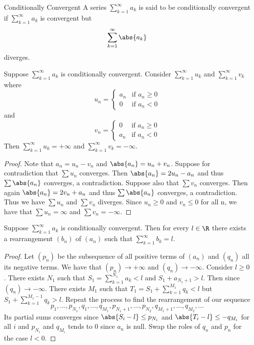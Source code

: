 \begin{defn}{Conditionally Convergent}{} A series $\sum_{k=1}^{\infty}a_k$ is said to be conditionally convergent if $\sum_{k=1}^{\infty}a_k$ is convergent but $$\sum_{k=1}^{\infty}\abs{a_k}$$ diverges. 
\end{defn}

\begin{thm}{}{} Suppose $\sum_{k=1}^{\infty}a_k$ is conditionally convergent. Consider $\sum_{k=1}^{\infty}u_k$ and $\sum_{k=1}^{\infty}v_k$ where $$u_n=\begin{cases}
a_n & \text{if $a_n\geq0$} \\
0 & \text{if $a_n<0$}
\end{cases}$$
and
$$v_n=\begin{cases}
0 & \text{if $a_n\geq0$} \\
a_n & \text{if $a_n<0$}
\end{cases}$$
Then $\sum_{k=1}^{\infty}u_k=+\infty$ and $\sum_{k=1}^{\infty}v_k=-\infty$. \tcbline
\begin{proof}
Note that $a_n=u_n-v_n$ and $\abs{a_n}=u_n+v_n$. Suppose for contradiction that $\sum u_n$ converges. Then $\abs{a_n}=2u_n-a_n$ and thus $\sum\abs{a_n}$ converges, a contradiction. Suppose also that $\sum v_n$ converges. Then again $\abs{a_n}=2v_n+a_n$ and thus $\sum\abs{a_n}$ converges, a contradiction. Thus we have $\sum u_n$ and $\sum v_n$ diverges. Since $u_n\geq 0$ and $v_n\leq 0$ for all n, we have that $\sum u_n=\infty$ and $\sum v_n=-\infty$. 
\end{proof}
\end{thm}

\begin{thm}{}{} Suppose $\sum_{k=1}^{\infty}a_k$ is conditionally convergent. Then for every $l\in\R$ there exists a rearrangement $(b_n)$ of $(a_n)$ such that $\sum_{k=1}^{\infty}b_k=l$. \tcbline
\begin{proof}
Let $(p_n)$ be the subsequence of all positive terms of $(a_n)$ and $(q_n)$ all its negative terms. We have that $(p_n)\to+\infty$ and $(q_n)\to-\infty$. Consider $l\geq0$. There exists $N_1$ such that $S_1=\sum_{k=1}^{N_1}a_k<l$ and $S_1+a_{N_1+1}>l$. Then since $(q_n)\to-\infty$. There exists $M_1$ such that $T_1=S_1+\sum_{k=1}^{M_1}q_k<l$ but $S_1+\sum_{k=1}^{M_1-1}q_k>l$. Repeat the process to find the rearrangement of our sequence $$p_1,\dots,p_{N_1},q_1,\dots,q_{M_1},p_{N_1+1},\dots,p_{N_2},q_{M_1+1},\dots,q_{M_2},\dots$$
Its partial sums converges since $\abs{S_i-l}\leq p_{N_i}$ and $\abs{T_i-l}\leq -q_{M_i}$ for all $i$ and $p_{N_i}$ and $q_{M_i}$ tends to $0$ since $a_n$ is null. Swap the roles of $q_n$ and $p_n$ for the case $l<0$. 
\end{proof}
\end{thm}

